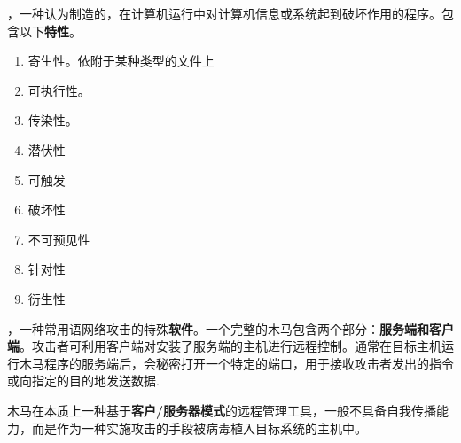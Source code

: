 ，一种认为制造的，在计算机运行中对计算机信息或系统起到破坏作用的程序。包含以下\textbf{特性}。
\begin{enumerate}
	\item 寄生性。依附于某种类型的文件上
	\item 可执行性。
	\item 传染性。
	\item 潜伏性
	\item 可触发
	\item 破坏性
	\item 不可预见性
	\item 针对性
	\item 衍生性
\end{enumerate}

，一种常用语网络攻击的特殊\textbf{软件}。一个完整的木马包含两个部分：\textbf{服务端和客户端}。攻击者可利用客户端对安装了服务端的主机进行远程控制。通常在目标主机运行木马程序的服务端后，会秘密打开一个特定的端口，用于接收攻击者发出的指令或向指定的目的地发送数据.

木马在本质上一种基于\textbf{客户/服务器模式}的远程管理工具，一般不具备自我传播能力，而是作为一种实施攻击的手段被病毒植入目标系统的主机中。























